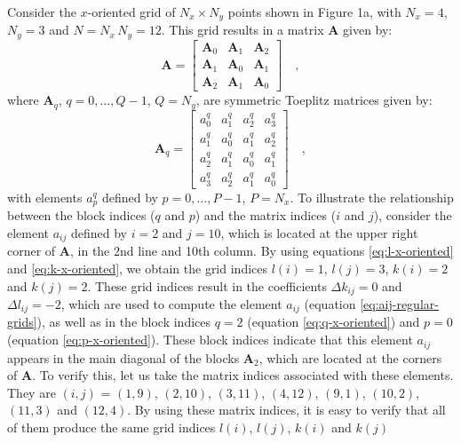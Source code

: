 \documentclass[manuscript,revised]{geophysics}
\begin{document}
Consider the $x$-oriented grid of $N_{x} \times N_{y}$ points shown in Figure 1a, 
with $N_{x} = 4$, $N_{y} = 3$ and $N = N_{x} \, N_{y} = 12$.
This grid results in a matrix $\mathbf{A}$ given by:
\begin{equation}
\mathbf{A} = \begin{bmatrix}
\mathbf{A}_{0} & \mathbf{A}_{1} & \mathbf{A}_{2} \\
\mathbf{A}_{1} & \mathbf{A}_{0} & \mathbf{A}_{1} \\
\mathbf{A}_{2} & \mathbf{A}_{1} & \mathbf{A}_{0}
\end{bmatrix} \quad ,
\label{eq:A-x-oriented-example}
\end{equation}
where $\mathbf{A}_{q}$, $q = 0, \dots, Q -1$, $Q = N_{y}$, 
are symmetric Toeplitz matrices given by:
\begin{equation}
\mathbf{A}_{q} = \begin{bmatrix}
a^{q}_{0} & a^{q}_{1} & a^{q}_{2} & a^{q}_{3} \\
a^{q}_{1} & a^{q}_{0} & a^{q}_{1} & a^{q}_{2} \\
a^{q}_{2} & a^{q}_{1} & a^{q}_{0} & a^{q}_{1} \\
a^{q}_{3} & a^{q}_{2} & a^{q}_{1} & a^{q}_{0}
\end{bmatrix} \quad ,
\label{eq:Aq-x-oriented}
\end{equation}
with elements $a^{q}_{p}$ defined by $p = 0, \dots, P - 1$, $P = N_{x}$.
To illustrate the relationship between the block indices ($q$ and $p$) and the matrix indices 
($i$ and $j$), consider the element $a_{ij}$ defined by $i = 2$ and $j = 10$, which is
located at the upper right corner of $\mathbf{A}$, in the 2nd line and 10th column.
By using equations \ref{eq:l-x-oriented} and \ref{eq:k-x-oriented}, we obtain the 
grid indices $l(i) = 1$, $l(j) = 3$, $k(i) = 2$ and $k(j) = 2$.
These grid indices result in the coefficients $\Delta k_{ij} = 0$ and $\Delta l_{ij} = -2$,
which are used to compute the element $a_{ij}$ (equation \ref{eq:aij-regular-grids}),
as well as in the block indices $q = 2$ (equation \ref{eq:q-x-oriented}) and 
$p = 0$ (equation \ref{eq:p-x-oriented}).
These block indices indicate that this element $a_{ij}$ appears in the main diagonal
of the blocks $\mathbf{A}_{2}$, which are located at the corners of $\mathbf{A}$.
To verify this, let us take the matrix indices associated with these elements.
They are $(i, j)$ = $(1, 9)$, $(2, 10)$, $(3, 11)$, $(4, 12)$, $(9, 1)$, $(10, 2)$, 
$(11, 3)$ and $(12, 4)$. By using these matrix indices, it is easy to verify that all
of them produce the same grid indices $l(i)$, $l(j)$, $k(i)$ and $k(j)$ 
\end{document}
